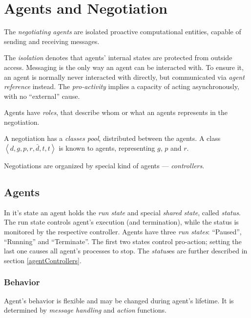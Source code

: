 %




\section{Agents and Negotiation}

The \emph{negotiating agents} are isolated proactive computational entities,
capable of sending and receiving messages.

The \emph{isolation} denotes that agents' internal states are protected
from outside access. Messaging is the only way an agent can be interacted with.
To ensure it, an agent is normally never interacted with directly, but 
communicated via \emph{agent reference} instead.
The \emph{pro-activity} implies a capacity of acting asynchronously, 
with no ``external'' cause.

Agents have \emph{roles}, that describe whom or what an agents represents
in the negotiation.

A negotiation has a \emph{classes pool}, distributed between the agents.
A class $\left< d, g, p, r, \bar d, t, t \right>$ is known to agents,
representing $g$, $p$ and $r$. 

Negotiations are organized by special kind of agents --- \emph{controllers}.


\subsection{Agents}

In it's state an agent holds the \emph{run state} and special \emph{shared
  state}, called \emph{status}. The run state controls agent's execution
(and termination), while the status is monitored by the respective controller.
Agents have three \emph{run states}: ``Paused'', ``Running'' and ``Terminate''.
The first two states control pro-action; setting the last one causes all
agent's processes to stop. The \emph{status}es are further described in
section \ref{agentControllers}.

\subsubsection{Behavior}

Agent's behavior is flexible and may be changed during agent's lifetime.
It is determined by \emph{message handling} and \emph{action} functions.

